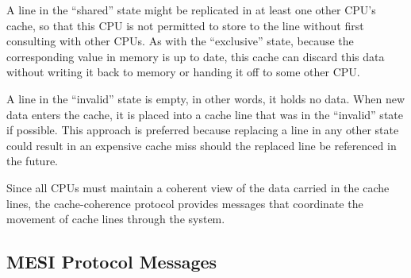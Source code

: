 A line in the ``shared'' state might be replicated in at least
one other CPU's cache, so that this CPU is not permitted to store
to the line without first consulting with other CPUs.
As with the ``exclusive'' state, because the corresponding value
in memory is up to date,
this cache can discard this data without writing it back to memory
or handing it off to some other CPU\@.

A line in the ``invalid'' state is empty, in other words, it holds
no data.
When new data enters the cache, it is placed into a
cache line that was in the ``invalid'' state if possible.
This approach is preferred because replacing a line in any other
state could result in an expensive cache miss should the replaced
line be referenced in the future.

Since all CPUs must maintain a coherent view of the data carried in
the cache lines, the cache-coherence protocol provides messages
that coordinate the movement of cache lines through the system.

\subsection{MESI Protocol Messages}
\label{sec:app:whymb:MESI Protocol Messages}

